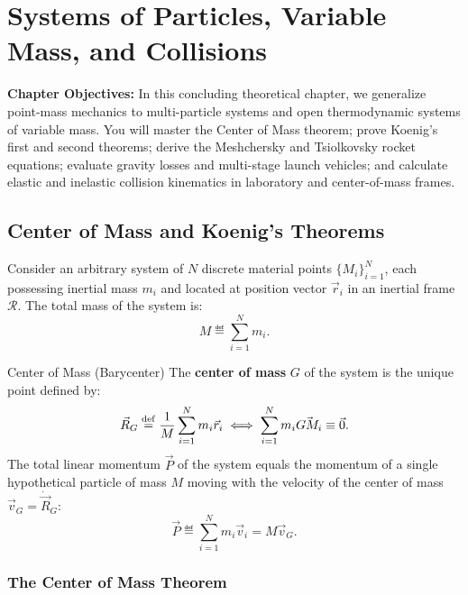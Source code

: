 \chapter{Systems of Particles, Variable Mass, and Collisions}
\label{ch:systems_collisions}

\begin{chapterintro}
\textbf{Chapter Objectives:} In this concluding theoretical chapter, we generalize point-mass mechanics to multi-particle systems and open thermodynamic systems of variable mass. You will master the Center of Mass theorem; prove Koenig's first and second theorems; derive the Meshchersky and Tsiolkovsky rocket equations; evaluate gravity losses and multi-stage launch vehicles; and calculate elastic and inelastic collision kinematics in laboratory and center-of-mass frames.
\end{chapterintro}

\section{Center of Mass and Koenig's Theorems}

Consider an arbitrary system of $N$ discrete material points $\{M_i\}_{i=1}^N$, each possessing inertial mass $m_i$ and located at position vector $\vec{r}_i$ in an inertial frame $\mathcal{R}$.
The total mass of the system is:
\begin{equation}
M \eqdef \sum_{i=1}^N m_i.
\end{equation}

\begin{definitionbox}{Center of Mass (Barycenter)}
The \textbf{center of mass} $G$ of the system is the unique point defined by:
\begin{equation}
\vec{R}_G \overset{\mathrm{def}}{=} \frac{1}{M} \sum_{i=1}^N m_i \vec{r}_i \iff \sum_{i=1}^N m_i \vec{GM_i} \equiv \vec{0}.
\end{equation}
The total linear momentum $\vec{P}$ of the system equals the momentum of a single hypothetical particle of mass $M$ moving with the velocity of the center of mass $\vec{v}_G = \dot{\vec{R}}_G$:
\begin{equation}
\vec{P} \eqdef \sum_{i=1}^N m_i \vec{v}_i = M \vec{v}_G.
\end{equation}
\end{definitionbox}

\subsection{The Center of Mass Theorem}

